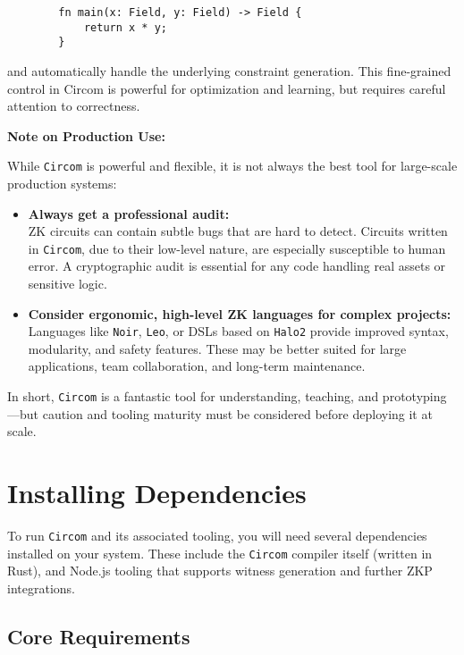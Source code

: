 \documentclass{article}
\begin{document}
	\begin{verbatim}
		fn main(x: Field, y: Field) -> Field {
			return x * y;
		}
	\end{verbatim}
	
	\noindent and automatically handle the underlying constraint generation. This fine-grained control in Circom is powerful for optimization and learning, but requires careful attention to correctness.
	
	\vspace{1em}
	
	\begin{warnBox}
		\textbf{Note on Production Use:}
		
		While \texttt{Circom} is powerful and flexible, it is not always the best tool for large-scale production systems:
		\begin{itemize}
			\item \textbf{Always get a professional audit:} \\
			ZK circuits can contain subtle bugs that are hard to detect. Circuits written in \texttt{Circom}, due to their low-level nature, are especially susceptible to human error. A cryptographic audit is essential for any code handling real assets or sensitive logic.
			
			\item \textbf{Consider ergonomic, high-level ZK languages for complex projects:} \\
			Languages like \texttt{Noir}, \texttt{Leo}, or DSLs based on \texttt{Halo2} provide improved syntax, modularity, and safety features. These may be better suited for large applications, team collaboration, and long-term maintenance.
		\end{itemize}
	\end{warnBox}
	
	\noindent In short, \texttt{Circom} is a fantastic tool for understanding, teaching, and prototyping—but caution and tooling maturity must be considered before deploying it at scale.
\section{Installing Dependencies}

To run \texttt{Circom} and its associated tooling, you will need several dependencies installed on your system. These include the \texttt{Circom} compiler itself (written in Rust), and Node.js tooling that supports witness generation and further ZKP integrations.
\subsection{Core Requirements}
\end{document}
